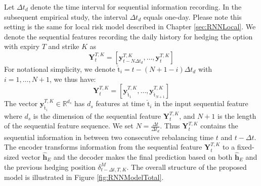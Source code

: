 \documentclass[letterpaper,12pt,titlepage,oneside,final]{book}
\numberwithin{equation}{section}
\theoremstyle{definition}
\newcommand{\vy}{\mathbf{y}}
\newcommand{\DT}{\Delta t}
\newcommand{\Real}{\mathbb{R}}
\newcommand{\nt}{\breve{\text{t}}}
\begin{document}
Let $\DT_{d}$ denote the time interval for sequential information recording. In  the subsequent empirical study, the interval $\DT_{d}$ equals one-day. Please note this setting is the same for local risk model described in Chapter \ref{sec:RNNLocal}.  We denote the sequential features recording the daily history for hedging the option with expiry $T$ and strike $K$ as
\[
\mathbf{Y}_{t}^{T,K}=\left[\vy^{T,K}_{t-N \DT_{d}},\dots,\vy^{T,K}_{t}\right]
\]
For notational simplicity, we denote $\nt_i=t-(N+1-i)\DT_d$ with $i=1, \dots,N+1$, we thus have:
\[
\mathbf{Y}_{t}^{T,K}=\left[\vy^{T,K}_{\nt_{1}},\dots,\vy^{T,K}_{\nt_{N+1}}\right]
\]
The vector $\vy^{T,K}_{\nt_{i}} \in \Real^{d_s}$ has  $d_s$ features at time $\nt_{i}$ in the input sequential feature where
 $d_s$ is the dimension of the sequential feature $\mathbf{Y}_{t}^{T,K}$, and
$N+1$ is the length of the sequential feature sequence. We set $N=\frac{\Delta t}{\Delta t_d}$. Thus $\mathbf{Y}_{t}^{T,K}$ contains the sequential information in between two consecutive rebalancing time $t$ and $t-\Delta t$.
The encoder transforms information from the sequential feature $\mathbf{Y}_{t}^{T,K}$ to  a fixed-sized vector
$\mathbf{\widehat{h}}_E$   and the decoder makes the final prediction based on both $\mathbf{\widehat{h}}_E$  and the previous hedging position $\delta^{M}_{t-\Delta t,T,K}$. The overall structure of the proposed model is illustrated in Figure \ref{fig:RNNModelTotal}. 
\end{document}

